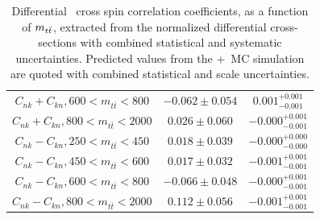 \begin{table}[htb]
\begin{tabular}{c | c c}
$C_{nk}+C_{kn}, {600 < m_{t\bar{t}} < 800}$ & $-0.062 \pm 0.054$ & $0.001^{+0.001}_{-0.001}$ \\
$C_{nk}+C_{kn}, {800 < m_{t\bar{t}} < 2000}$ & $0.026 \pm 0.060$ & $-0.000^{+0.001}_{-0.001}$ \\
$C_{nk}-C_{kn}, {250 < m_{t\bar{t}} < 450}$ & $0.018 \pm 0.039$ & $-0.000^{+0.000}_{-0.000}$ \\
$C_{nk}-C_{kn}, {450 < m_{t\bar{t}} < 600}$ & $0.017 \pm 0.032$ & $-0.001^{+0.001}_{-0.001}$ \\
$C_{nk}-C_{kn}, {600 < m_{t\bar{t}} < 800}$ & $-0.066 \pm 0.048$ & $-0.000^{+0.001}_{-0.001}$ \\
$C_{nk}-C_{kn}, {800 < m_{t\bar{t}} < 2000}$ & $0.112 \pm 0.056$ & $-0.001^{+0.001}_{-0.001}$ \\
\hline
\end{tabular}
    \caption{
    Differential \ttbar\ cross spin correlation coefficients, as a function of $m_{t\bar{t}}$, extracted from the normalized differential cross-sections with combined statistical and systematic uncertainties. 
    Predicted values from the \Powheg+\Pythia\ MC simulation are quoted with combined statistical and scale uncertainties.
    }
    \label{tab:Extracted_Coefficients_2D_Cross_Spin_Correlations}
\end{table}


